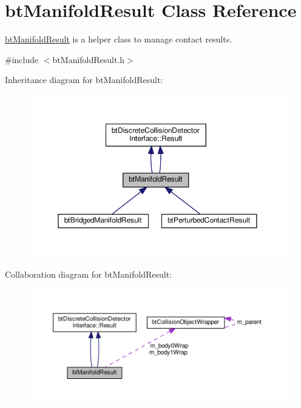 \hypertarget{classbtManifoldResult}{}\section{bt\+Manifold\+Result Class Reference}
\label{classbtManifoldResult}


\hyperlink{classbtManifoldResult}{bt\+Manifold\+Result} is a helper class to manage contact results.  




{\ttfamily \#include $<$bt\+Manifold\+Result.\+h$>$}



Inheritance diagram for bt\+Manifold\+Result\+:
\nopagebreak
\begin{figure}[H]
\begin{center}
\leavevmode
\includegraphics[width=350pt]{classbtManifoldResult__inherit__graph}
\end{center}
\end{figure}


Collaboration diagram for bt\+Manifold\+Result\+:
\nopagebreak
\begin{figure}[H]
\begin{center}
\leavevmode
\includegraphics[width=350pt]{classbtManifoldResult__coll__graph}
\end{center}
\end{figure}
